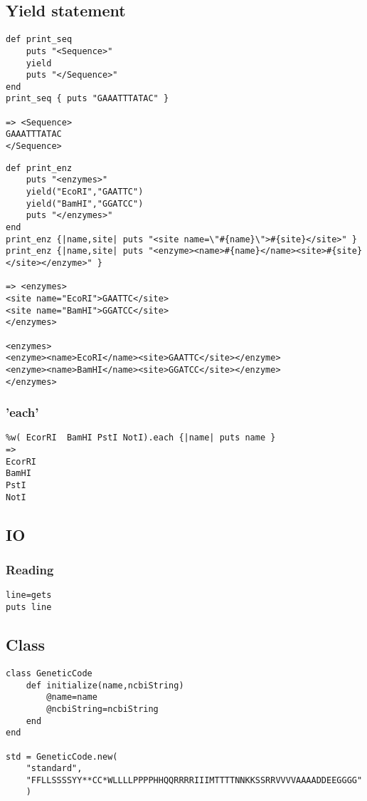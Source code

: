 \documentclass{article}
\begin{document}
\subsection{Yield statement}

\begin{lstlisting}
def print_seq
	puts "<Sequence>"
	yield
	puts "</Sequence>"
end
print_seq { puts "GAAATTTATAC" }

=> <Sequence>
GAAATTTATAC
</Sequence>
\end{lstlisting}

\begin{lstlisting}
def print_enz
	puts "<enzymes>"
	yield("EcoRI","GAATTC")
	yield("BamHI","GGATCC")
	puts "</enzymes>"
end
print_enz {|name,site| puts "<site name=\"#{name}\">#{site}</site>" }
print_enz {|name,site| puts "<enzyme><name>#{name}</name><site>#{site}</site></enzyme>" }

=> <enzymes>
<site name="EcoRI">GAATTC</site>
<site name="BamHI">GGATCC</site>
</enzymes>

<enzymes>
<enzyme><name>EcoRI</name><site>GAATTC</site></enzyme>
<enzyme><name>BamHI</name><site>GGATCC</site></enzyme>
</enzymes>
\end{lstlisting}

\subsubsection{ 'each'}
\begin{lstlisting}
%w( EcorRI  BamHI PstI NotI).each {|name| puts name }
=>
EcorRI
BamHI
PstI
NotI
\end{lstlisting}

\subsection{IO}
\subsubsection{Reading}
\begin{lstlisting}
line=gets
puts line
\end{lstlisting}

\subsection{Class}
\begin{lstlisting}
class GeneticCode
	def initialize(name,ncbiString)
		@name=name
		@ncbiString=ncbiString
	end
end

std = GeneticCode.new(
	"standard",
	"FFLLSSSSYY**CC*WLLLLPPPPHHQQRRRRIIIMTTTTNNKKSSRRVVVVAAAADDEEGGGG"
	)
\end{lstlisting}
\end{document}
